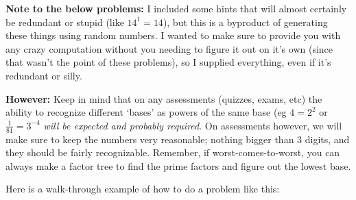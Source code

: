 \documentclass{ximera}
\begin{document}
\textbf{Note to the below problems:} I included some hints that will almost certainly be redundant or stupid (like $14^1 = 14$), but this is a byproduct of generating these things using random numbers. I wanted to make sure to provide you with any crazy computation without you needing to figure it out on it's own (since that wasn't the point of these problems), so I supplied everything, even if it's redundant or silly.

\textbf{However:} Keep in mind that on any assessments (quizzes, exams, etc) the ability to recognize different `bases' as powers of the same base (eg $4 = 2^2$ or $\frac{1}{81} = 3^{-4}$ \textit{will be expected and probably required}. On assessments however, we will make sure to keep the numbers very reasonable; nothing bigger than 3 digits, and they should be fairly recognizable. Remember, if worst-comes-to-worst, you can always make a factor tree to find the prime factors and figure out the lowest base.



Here is a walk-through example of how to do a problem like this:
\end{document}
